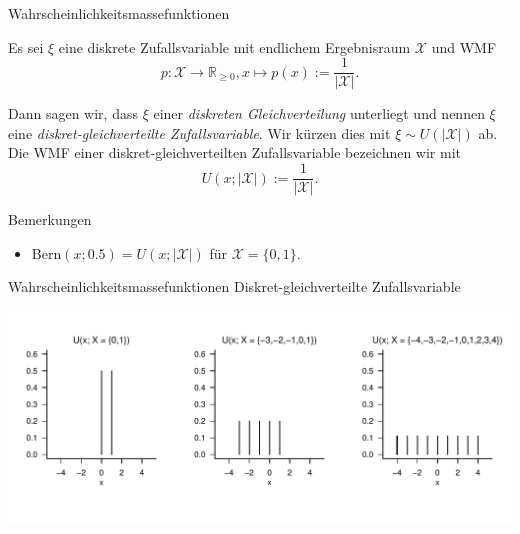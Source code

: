 \documentclass[
  8pt,
  ignorenonframetext,
]{beamer}
\begin{document}
\begin{frame}{Wahrscheinlichkeitsmassefunktionen}
\protect\hypertarget{wahrscheinlichkeitsmassefunktionen-5}{}
\small
\begin{definition}
\justifying
Es sei $\xi$ eine diskrete Zufallsvariable mit endlichem Ergebnisraum $\mathcal{X}$ und WMF
\begin{equation}
p : \mathcal{X} \to \mathbb{R}_{\ge 0}, x\mapsto p(x) := \frac{1}{|\mathcal{X}|}.
\end{equation}

Dann sagen wir, dass $\xi$ einer \textit{diskreten Gleichverteilung} unterliegt
und nennen $\xi$ eine \textit{diskret-gleichverteilte Zufallsvariable}. Wir kürzen
dies mit $\xi \sim U(|\mathcal{X}|)$ ab. Die WMF einer diskret-gleichverteilten
Zufallsvariable bezeichnen wir mit
\begin{equation}
U(x;|\mathcal{X}|) := \frac{1}{|\mathcal{X}|}.
\end{equation}
\end{definition}

Bemerkungen

\begin{itemize}
\item $\mbox{Bern}(x;0.5) = U(x;|\mathcal{X}|)$ für $\mathcal{X} = \{0,1\}$.
\end{itemize}
\end{frame}

\begin{frame}{Wahrscheinlichkeitsmassefunktionen}
\protect\hypertarget{wahrscheinlichkeitsmassefunktionen-6}{}
Diskret-gleichverteilte Zufallsvariable \vspace{1cm}

\begin{center}\includegraphics[width=1\linewidth]{4_Abbildungen/wtfi_4_gleichverteilung_wmf} \end{center}
\end{frame}
\end{document}
